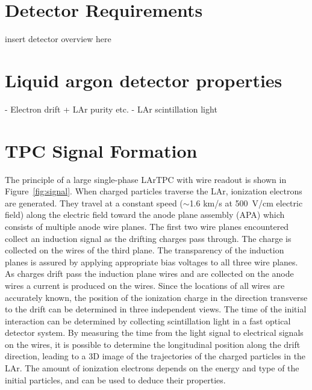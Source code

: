 
\section{Detector Requirements}\label{sec:detector_requirements}

insert detector overview here 

\section{Liquid argon detector properties}
- Electron drift + LAr purity etc.
- LAr scintillation light 

\section{TPC Signal Formation}\label{sec:tpc_signal_formation}


The principle of a large single-phase LArTPC with wire readout is shown in 
Figure~\ref{fig:signal}. When charged particles traverse the LAr,
ionization electrons are generated. They %
travel at a constant speed 
($\sim$1.6 km/s at 500~V/cm electric field) along the electric field 
toward the anode plane assembly (APA) which consists of multiple anode wire planes. 
The first two wire planes encountered collect 
an induction signal as the drifting charges pass through.  The charge is collected 
on the wires of the third plane. The transparency of the induction planes is assured by 
applying appropriate bias voltages to all three wire planes. As charges drift pass the induction 
plane wires and are collected on the anode wires
a current is produced on the wires. Since the locations of all wires are 
accurately known, the position of the ionization charge in the direction 
transverse to the drift can be determined in three independent views. The time 
of the initial interaction can be determined by collecting scintillation light 
in a fast optical detector system. By measuring the time from the light signal 
to electrical signals on the wires, it is possible to determine the longitudinal position 
along the drift direction, leading to %
a 3D image of the trajectories 
of the charged particles in the LAr. The amount of ionization electrons depends on 
the energy and type of the initial particles, and can be used to deduce their properties.

